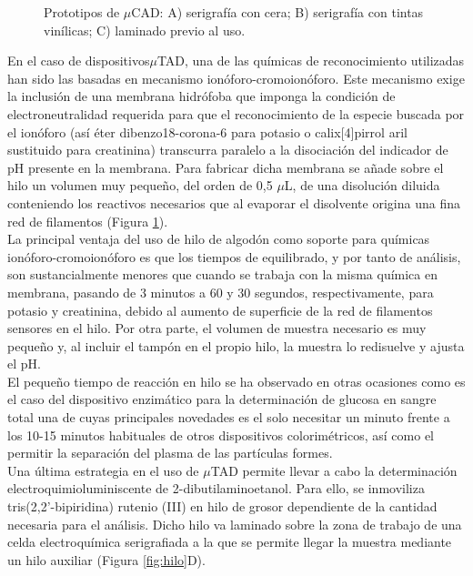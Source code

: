 \documentclass{article}
\begin{document}
\begin{figure}[h]
	\caption{Prototipos de $\mu$CAD: A) serigrafía con cera; B) serigrafía con tintas vinílicas; C) laminado previo al uso.}
	\label{fig:micro}
\end{figure}

En el caso de dispositivos$\mu$TAD, una de las químicas de reconocimiento utilizadas han sido las basadas en mecanismo ionóforo-cromoionóforo. Este mecanismo exige la inclusión de una membrana hidrófoba que imponga la condición de electroneutralidad requerida para que el reconocimiento de la especie buscada por el ionóforo (así éter dibenzo18-corona-6 para potasio\cite{Erenas2016} o calix[4]pirrol aril sustituido para creatinina\cite{erenas2019}) transcurra paralelo a la disociación del indicador de pH presente en la membrana. Para fabricar dicha membrana se añade sobre el hilo un volumen muy pequeño, del orden de 0,5 $\mu$L, de una disolución diluida conteniendo los reactivos necesarios que al evaporar el disolvente origina una fina red de filamentos (Figura \ref{fig:micro}).\\

La principal ventaja del uso de hilo de algodón como soporte para químicas ionóforo-cromoionóforo es que los tiempos de equilibrado, y por tanto de análisis, son sustancialmente menores que cuando se trabaja con la misma química en membrana, pasando de 3 minutos a 60 y 30 segundos, respectivamente, para potasio y creatinina, debido al aumento de superficie de la red de filamentos sensores en el hilo. Por otra parte, el volumen de muestra necesario es muy pequeño y, al incluir el tampón en el propio hilo, la muestra lo redisuelve y ajusta el pH. \\
El pequeño tiempo de reacción en hilo se ha observado en otras ocasiones como es el caso del dispositivo enzimático para la determinación de glucosa en sangre total una de cuyas principales novedades es el solo necesitar un minuto frente a los 10-15 minutos habituales de otros dispositivos colorimétricos, así como el permitir la separación del plasma de las partículas formes.\\

Una última estrategia en el uso de $\mu$TAD permite llevar a cabo la determinación electroquimioluminiscente de 2-dibutilaminoetanol. Para ello, se inmoviliza tris(2,2'-bipiridina) rutenio (III) en hilo de grosor dependiente de la cantidad necesaria para el análisis. Dicho hilo va laminado sobre la zona de trabajo de una celda electroquímica serigrafiada a la que se permite llegar la muestra mediante un hilo auxiliar (Figura \ref{fig:hilo}D).\\
\end{document}

